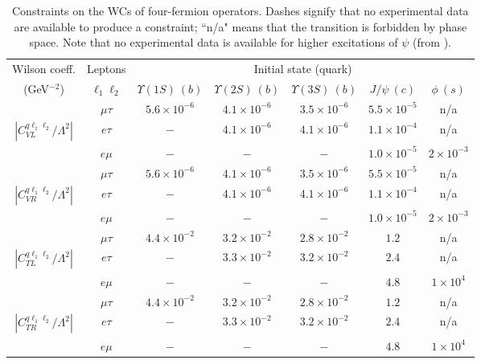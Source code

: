 \documentclass[12pt]{article}
\begin{document}
\begin{table*}
\begin{center}
\footnotesize
\begin{tabular}{ccccccc}
\hline \hline
Wilson coeff. & Leptons &\multicolumn{5}{c}{Initial state (quark)}\\
(GeV$^{-2}$) & $\ell_1 \ell_2$ & $\Upsilon(1S) \ (b)$ & $\Upsilon(2S) \ (b)$ & $\Upsilon(3S) \ (b)$ 
 & $J/\psi \ (c)$ & $\phi \ (s)$  \\ \hline
$~$ & $\mu \tau$ & $ 5.6 \times 10^{-6}$ & $4.1 \times 10^{-6}$ & $3.5 \times 10^{-6}$ 
 & $5.5 \times 10^{-5}$ & n/a \\
%
$\left| C_{VL}^{q\ell_1\ell_2}/\Lambda^2 \right|$ & $e \tau$ & $-$ & $4.1 \times 10^{-6}$ & $4.1 \times 10^{-6}$ 
 & $1.1 \times 10^{-4}$ & n/a \\ 
%
$~$ & $e \mu$ & $-$ & $-$ & $-$  
& $1.0 \times 10^{-5}$ & $2 \times 10^{-3}$  \\
\hline
$~$ & $\mu \tau$  & $ 5.6 \times 10^{-6}$ & $4.1 \times 10^{-6}$ & $3.5 \times 10^{-6}$ 
 & $5.5 \times 10^{-5}$ & n/a \\
%
$\left| C_{VR}^{q\ell_1\ell_2}/{\Lambda^2} \right|$ & $e \tau$ & $-$ & $4.1 \times 10^{-6}$ & $4.1 \times 10^{-6}$ 
 & $1.1 \times 10^{-4}$ & n/a \\
%
$~$ & $e \mu$ & $-$ & $-$ & $-$ 
 & $1.0 \times 10^{-5}$ & $2 \times 10^{-3}$ \\
\hline
$~$  & $\mu \tau$  & $ 4.4 \times 10^{-2}$ & $3.2 \times 10^{-2}$ & $2.8 \times 10^{-2}$ 
 & $1.2$ & n/a \\
%
$\left| {C_{TL}^{q\ell_1\ell_2}}/{\Lambda^2} \right|$ & $e \tau$ & $-$ & $3.3 \times 10^{-2}$ & $3.2 \times 10^{-2}$ 
 & $2.4$ & n/a \\
%
$~$ & $e \mu$ & $-$ & $-$ & $-$ 
 & $4.8$ & $1 \times 10^{4}$ \\
\hline
$~$  & $\mu \tau$  & $ 4.4 \times 10^{-2}$ & $3.2 \times 10^{-2}$ & $2.8 \times 10^{-2}$ 
 & $1.2$ & n/a \\
%
$\left| {C_{TR}^{q\ell_1\ell_2}}/{\Lambda^2} \right|$ & $e \tau$ & $-$ & $3.3 \times 10^{-2}$ & $3.2 \times 10^{-2}$ 
 & $2.4$ & n/a \\
%
$~$ & $e \mu$ & $-$ & $-$ & $-$ 
 & $4.8$ & $1 \times 10^{4}$ \\
 \hline \hline
\end{tabular}
\end{center}
\caption{\label{tab:V4fermion}Constraints on the WCs of four-fermion operators. Dashes signify that 
no experimental data are available to produce a constraint; ``n/a" means that the transition is forbidden by phase space.
Note that no experimental data is available for higher excitations of $\psi$ (from \cite{Hazard:2016fnc}).}
\end{table*}
\end{document}
